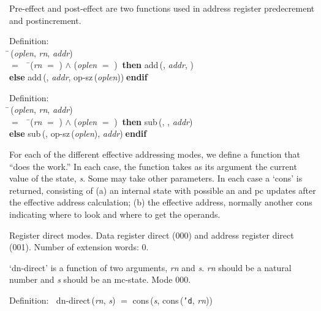  Pre-effect and post-effect are two functions used in address
 register predecrement and postincrement.
\begin{tabbing}{\sc Definition}: \\  
\=\,({\it{oplen\/}}, {\it{rn\/}}, {\it{addr\/}}) \\ 
$=$$\;\;\;\;$\=({\it{rn\/}} $=$ {}) $\wedge$ ({\it{oplen\/}} $=$ {})$\;\;${\bf then }{\rm{add}}\,({}, {\it{addr\/}}, {}) \\ 
{\bf else }{\rm{add}}\,({}, {\it{addr\/}}, {\rm{op-sz}}\,({\it{oplen\/}}))$\;${\bf  endif}\-\-
\end{tabbing}

\begin{tabbing}{\sc Definition}: \\  
\=\,({\it{oplen\/}}, {\it{rn\/}}, {\it{addr\/}}) \\ 
$=$$\;\;\;\;$\=({\it{rn\/}} $=$ {}) $\wedge$ ({\it{oplen\/}} $=$ {})$\;\;${\bf then }{\rm{sub}}\,({}, {}, {\it{addr\/}}) \\ 
{\bf else }{\rm{sub}}\,({}, {\rm{op-sz}}\,({\it{oplen\/}}), {\it{addr\/}})$\;${\bf  endif}\-\-
\end{tabbing}

 For each of the different effective addressing modes, we define a
 function that ``does the work.''  In each case, the function takes
 as its argument the current value of the state, {\it{s\/}}.  Some may
 take other parameters.  In each case a `cons' is returned, consisting
 of (a) an internal state with possible an and pc updates after the
 effective address calculation; (b) the effective address, normally
 another cons indicating where to look and where to get the operands.

 \bigskip
 Register direct modes.  Data register direct (000) and address
 register direct (001).
 Number of extension words: 0.

 `dn-direct' is a function of two arguments, {\it{rn\/}} and {\it{s\/}}.  {\it{rn\/}} should be
 a natural number and {\it{s\/}} should be an mc-state.  Mode 000.
\begin{tabbing}{\sc Definition}:$\;\;$
{\rm{dn-direct}}\,({\it{rn\/}}, {\it{s\/}}) $=$ {\rm{cons}}\,({\it{s\/}}, {\rm{cons}}\,({\tt{'}}{\tt{d}}, {\it{rn\/}}))
\end{tabbing}

